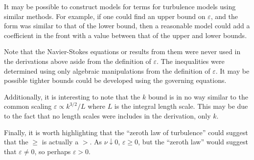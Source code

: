 \documentclass[ccbysa,note,git]{bmtreport}
\begin{document}
It may be possible to construct models for terms for turbulence models using similar methods. For example, if one could find an upper bound on $\varepsilon$, and the form was similar to that of the lower bound, then a reasonable model could add a coefficient in the front with a value between that of the upper and lower bounds.

Note that the Navier-Stokes equations or results from them were never used in the derivations above aside from the definition of $\varepsilon$. The inequalities were determined using only algebraic manipulations from the definition of $\varepsilon$. It may be possible tighter bounds could be developed using the governing equations.

Additionally, it is interesting to note that the $k$ bound is in no way similar to the common scaling $\varepsilon \varpropto k^{3/2} / L$ where $L$ is the integral length scale. This may be due to the fact that no length scales were includes in the derivation, only $k$.

Finally, it is worth highlighting that the ``zeroth law of turbulence'' could suggest that the $\geq$ is actually a $>$. As $\nu \downarrow 0$, $\varepsilon \geq 0$, but the ``zeroth law'' would suggest that $\varepsilon \neq 0$, so perhaps $\varepsilon > 0$.

\end{document}
